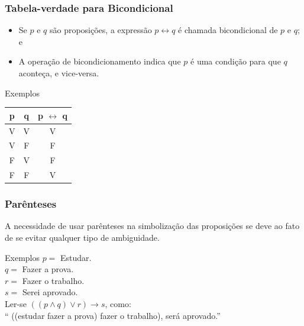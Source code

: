 \documentclass{beamer}
\begin{document}
\begin{frame}
\frametitle{Tabela-verdade para Bicondicional}

\begin{itemize}
\item Se $p$ e $q$ são proposições, a expressão $p \leftrightarrow q$ é chamada bicondicional de $p$ e $q$; e
\item A operação de bicondicionamento indica que $p$ é uma condição para que $q$ aconteça, e vice-versa.
\end{itemize} \vfill

\begin{exampleblock}{Exemplos}
\center
\begin{tabular}{|c|c|c|}
	\hline
	\textbf{p} & \textbf{q} & \textbf{p $\leftrightarrow$ q}\\ \hline
	V & V & V \\ \hline
	V & F & F \\ \hline
	F & V & F \\ \hline
	F & F & V \\ \hline
\end{tabular}
\end{exampleblock}
\end{frame}

\begin{frame}
\frametitle{Parênteses}

A necessidade de usar parênteses na simbolização das proposições se deve ao fato de se evitar qualquer tipo de ambiguidade.\vfill

\begin{exampleblock}{Exemplos}
$p =$ Estudar.\\
$q =$ Fazer a prova.\\
$r =$ Fazer o trabalho.\\
$s =$ Serei aprovado.\\
Ler-se $((p \wedge q) \vee r) \rightarrow s$, como:\\
`` ((estudar  fazer a prova)  fazer o trabalho),  será aprovado.''
\end{exampleblock}
\end{frame}
\end{document}
